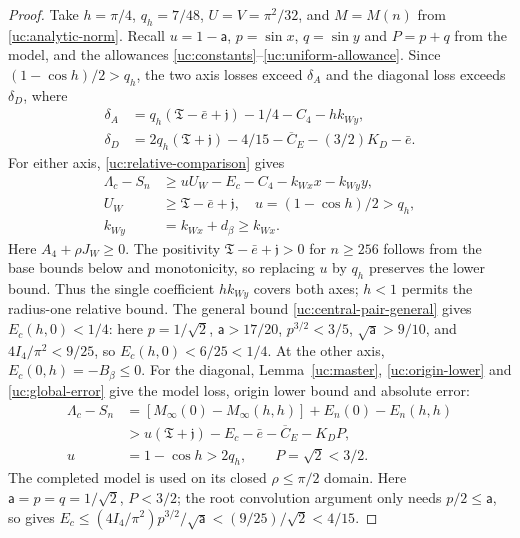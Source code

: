 \begin{proof}
Take $h=\pi/4$, $q_h=7/48$, $U=V=\pi^2/32$, and $M=M(n)$ from
\eqref{uc:analytic-norm}.  Recall $u=1-\mathsf a$, $p=\sin x$, $q=\sin y$ and $P=p+q$
from the model, and the allowances \eqref{uc:constants}--\eqref{uc:uniform-allowance}.
Since $(1-\cos h)/2>q_h$, the two axis
losses exceed $\delta_A$ and the diagonal loss exceeds $\delta_D$, where
\begin{align*}
 \delta_A&=q_h(\mathfrak{T}-\bar e+\mathfrak{j})-1/4-C_4-hk_{Wy},\\
 \delta_D&=2q_h(\mathfrak{T}+\mathfrak{j})-4/15-\overline C_E-(3/2)K_D-\bar e.
\end{align*}
For either axis, \eqref{uc:relative-comparison} gives
\[
\begin{aligned}
\Lambda_c-S_n&\geq uU_W-E_c-C_4-k_{Wx}x-k_{Wy}y,\\
U_W&\geq\mathfrak T-\bar e+\mathfrak j,
\quad u=(1-\cos h)/2>q_h,\\
k_{Wy}&=k_{Wx}+d_\beta\geq k_{Wx}.
\end{aligned}
\]
Here $A_4+\rho J_W\geq0$. The positivity
$\mathfrak T-\bar e+\mathfrak j>0$ for $n\geq256$ follows from the
base bounds below and monotonicity, so replacing $u$ by $q_h$ preserves
the lower bound. Thus the single coefficient $hk_{Wy}$ covers both axes;
$h<1$ permits the radius-one relative bound.
The general bound \eqref{uc:central-pair-general} gives
$E_c(h,0)<1/4$: here $p=1/\sqrt2$, $\mathsf a>17/20$,
$p^{3/2}<3/5$, $\sqrt{\mathsf a}>9/10$, and
$4I_4/\pi^2<9/25$, so $E_c(h,0)<6/25<1/4$.
At the other axis, $E_c(0,h)=-B_\beta\leq0$.
For the diagonal, Lemma~\ref{uc:master}, \eqref{uc:origin-lower}
and \eqref{uc:global-error} give the model loss, origin lower bound
and absolute error:
\[
\begin{aligned}
\Lambda_c-S_n
&=[M_\infty(0)-M_\infty(h,h)]+E_n(0)-E_n(h,h)\\
&>u(\mathfrak T+\mathfrak j)-E_c-\bar e-\overline C_E-K_DP,\\
u&=1-\cos h>2q_h,\qquad P=\sqrt2<3/2.
\end{aligned}
\]
The completed model is used on its closed $\rho\leq\pi/2$ domain.
Here $\mathsf{a}=p=q=1/\sqrt2$, $P<3/2$; the root convolution argument only
needs $p/2\leq \mathsf{a}$, so gives
$E_c\leq(4I_4/\pi^2)p^{3/2}/\sqrt {\mathsf{a}}< (9/25)/\sqrt2<4/15$.


\end{proof}
